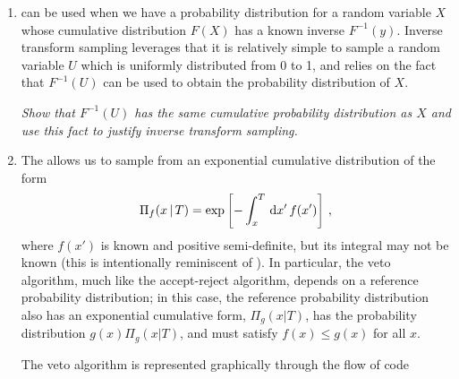 \begin{problems}
{    \begin{enumerate}[label=\alph*)]
        \item
         can be used when we have a probability distribution for a random variable \(X\) whose cumulative distribution \(F(X)\) has a known inverse \(F^{-1}(y)\).
        Inverse transform sampling leverages that it is relatively simple to sample a random variable \(U\) which is uniformly distributed from 0 to 1, and relies on the fact that \(F^{-1}(U)\) can be used to obtain the probability distribution of \(X\).

        \textit{Show that \(F^{-1}(U)\) has the same cumulative probability distribution as \(X\) and use this fact to justify inverse transform sampling.}


        \item
        The  allows us to sample from an exponential cumulative distribution of the form
        \begin{align}
            \Pi_f(x\,|\,T) = \exp\left[-\int_x^T \, \dd x' \, f(x')\right]
            \,,
        \end{align}
        where \(f(x')\) is known and positive semi-definite, but its integral may not be known (this is intentionally reminiscent of ).
        In particular, the veto algorithm, much like the accept-reject algorithm, depends on a reference probability distribution;
        in this case, the reference probability distribution also has an exponential cumulative form, \(\Pi_g(x | T)\), has the probability distribution \(g(x) \Pi_g(x | T)\), and must satisfy \(f(x) \leq g(x)\) for all \(x\).

        The veto algorithm is represented graphically through the flow of code
        \begin{center}
            \raisebox{-\height}
            {
            }
\end{center}
\end{enumerate}}
\end{problems}
